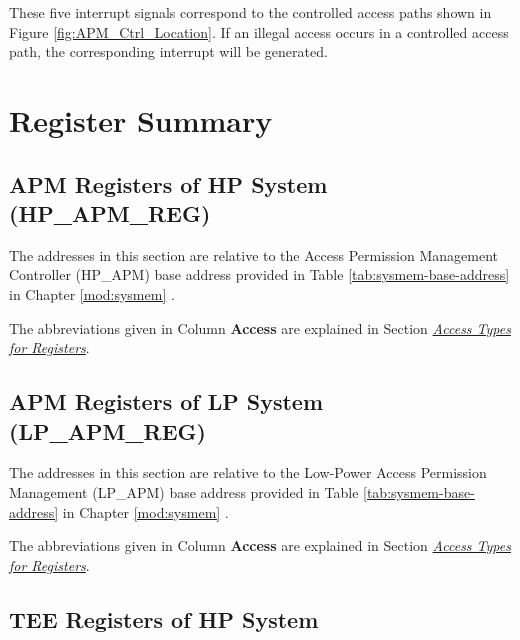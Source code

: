 \documentclass[main\_\_EN.tex]{subfiles}
\begin{document}
These five interrupt signals correspond to the controlled access paths shown in Figure \ref{fig:APM_Ctrl_Location}. If an illegal access occurs in a controlled access path, the corresponding interrupt will be generated.



\hypertarget{permctrl-reg-summ}{}
\section{Register Summary}
\label{sec:permctrl-reg-summ}


\subsection{APM Registers of HP System (HP\_APM\_REG)}
\label{sec:permctrl-reg-hp}

The addresses in this section are relative to the Access Permission Management Controller (HP\_APM) base address provided in Table \ref{tab:sysmem-base-address} in Chapter \ref{mod:sysmem} \textit{}.

The abbreviations given in Column \textbf{Access} are explained in Section \hyperref[glossary-access-types]{\textit{Access Types for Registers}}.



\subsection{APM Registers of LP System (LP\_APM\_REG)}
\label{sec:permctrl-reg-lp}

The addresses in this section are relative to the Low-Power Access Permission Management (LP\_APM) base address provided in Table \ref{tab:sysmem-base-address} in Chapter \ref{mod:sysmem} \textit{}.

The abbreviations given in Column \textbf{Access} are explained in Section \hyperref[glossary-access-types]{\textit{Access Types for Registers}}.



\subsection{TEE Registers of HP System}
\end{document}
